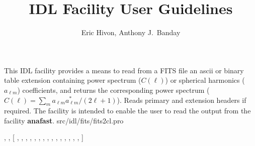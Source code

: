 

\sloppy

\title{\healpix IDL Facility User Guidelines}
 \section[fits2cl]{ }
\label{idl:fits2cl}
\author{Eric Hivon, Anthony J.~Banday}

\begin{facility}
{This IDL facility provides a means to
read from a FITS file an ascii or binary table extension containing power 
spectrum ($C(\ell)$) or spherical harmonics ($a_{\ell m}$) coefficients, and returns
the corresponding power spectrum ($C(\ell) = \sum_m a_{\ell m}a^*_{\ell m} / (2\ell+1)$). Reads primary and extension headers if
required. The facility is intended to enable the user to read the
output from the \healpix facility \textbf{anafast}.
}
{src/idl/fits/fits2cl.pro}
\end{facility}

\begin{IDLformat}
{\thedocid, 
, 
[%
, %
 ,
 ,
, 
, 
, 
,  
, 
, 
, 
, 
, 
, 
, 
, 
%
]}
\end{IDLformat}

